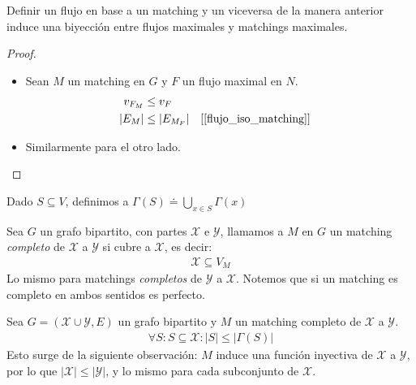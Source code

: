 \begin{proposition}
Definir un flujo en base a un matching y un viceversa de la manera anterior induce una biyección entre flujos maximales y matchings maximales.
\end{proposition}
\begin{proof}
\begin{itemize}
    \item Sean $M$ un matching en $G$ y $F$ un flujo maximal en $N$.
    \begin{align}
        v_{F_M} &\le v_F\\
        \left| E_M \right| &\le \left| E_{M_F} \right| &&  [\ref{flujo_iso_matching}]
    \end{align}
    \item Similarmente para el otro lado.
\end{itemize}
\end{proof}


\begin{definition}
Dado $S \subseteq V$,  definimos a $\Gamma(S) \doteq \bigcup_{x\in S} \Gamma(x)$
\end{definition}

\begin{definition} Sea $G$ un grafo bipartito, con partes $\mathcal{X}$ e $\mathcal{Y}$, llamamos a
$M$ en $G$ un matching \emph{completo} de $\mathcal{X}$ a $\mathcal{Y}$ si cubre a $\mathcal{X}$, es decir:
\begin{align}
\mathcal{X} \subseteq V_M
\end{align}
Lo mismo para matchings \emph{completos} de $\mathcal{Y}$ a $\mathcal{X}$. Notemos que si un matching es completo en ambos sentidos es perfecto.
\end{definition}

\begin{definition}
Sea $G = (\mathcal{X} \cup \mathcal{Y}, E)$ un grafo bipartito y $M$ un matching completo de $\mathcal{X}$ a $\mathcal{Y}$.
\begin{align}
    \forall  S: S \subseteq \mathcal{X} : \left|S\right| \le \left|\Gamma(S)\right|
\end{align}
Esto surge de la siguiente observación: $M$ induce una función inyectiva de $\mathcal{X}$ a $\mathcal{Y}$, por lo que $|\mathcal{X}| \le |\mathcal{Y}|$, y lo mismo para cada subconjunto de $\mathcal{X}$. 
\end{definition}

